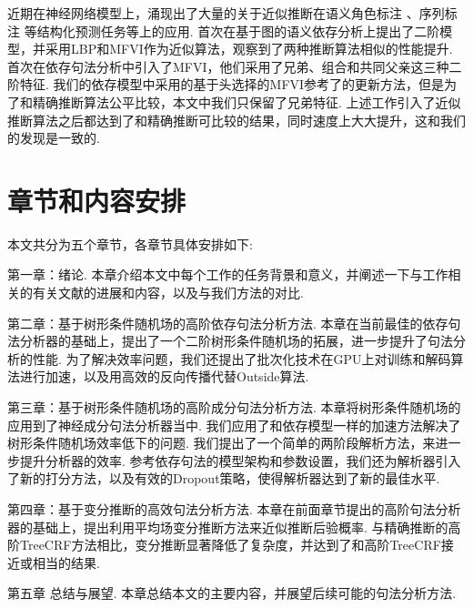 近期在神经网络模型上，涌现出了大量的关于近似推断在语义角色标注 \citep{li-etal-2020-high}、序列标注 \citep{wang-etal-2020-ain}等结构化预测任务等上的应用.
\citet{wang-etal-2019-second}首次在基于图的语义依存分析上提出了二阶模型，并采用LBP和MFVI作为近似算法，观察到了两种推断算法相似的性能提升.
\citet{wang-tu-2020-second}首次在依存句法分析中引入了MFVI，他们采用了兄弟、组合和共同父亲这三种二阶特征.
我们的依存模型中采用的基于头选择的MFVI参考了\citet{wang-tu-2020-second}的更新方法，但是为了和精确推断算法公平比较，本文中我们只保留了兄弟特征.
上述工作引入了近似推断算法之后都达到了和精确推断可比较的结果，同时速度上大大提升，这和我们的发现是一致的.

\section{章节和内容安排}

本文共分为五个章节，各章节具体安排如下:

第一章：绪论.
本章介绍本文中每个工作的任务背景和意义，并阐述一下与工作相关的有关文献的进展和内容，以及与我们方法的对比.

第二章：基于树形条件随机场的高阶依存句法分析方法.
本章在当前最佳的依存句法分析器的基础上，提出了一个二阶树形条件随机场的拓展，进一步提升了句法分析的性能.
为了解决效率问题，我们还提出了批次化技术在GPU上对训练和解码算法进行加速，以及用高效的反向传播代替Outside算法.

第三章：基于树形条件随机场的高阶成分句法分析方法.
本章将树形条件随机场的应用到了神经成分句法分析器当中.
我们应用了和依存模型一样的加速方法解决了树形条件随机场效率低下的问题.
我们提出了一个简单的两阶段解析方法，来进一步提升分析器的效率.
参考依存句法的模型架构和参数设置，我们还为解析器引入了新的打分方法，以及有效的Dropout策略，使得解析器达到了新的最佳水平.

第四章：基于变分推断的高效句法分析方法.
本章在前面章节提出的高阶句法分析器的基础上，提出利用平均场变分推断方法来近似推断后验概率.
与精确推断的高阶TreeCRF方法相比，变分推断显著降低了复杂度，并达到了和高阶TreeCRF接近或相当的结果.

第五章 总结与展望.
本章总结本文的主要内容，并展望后续可能的句法分析方法.

